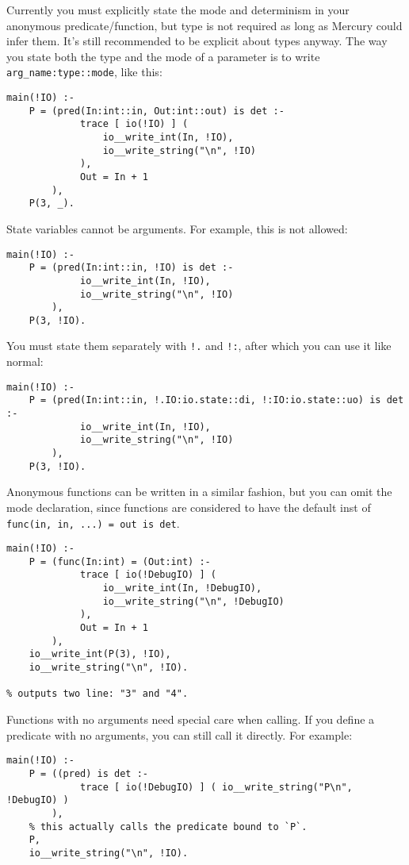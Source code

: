Currently you must explicitly state the mode and determinism in your anonymous predicate/function, but type is not required as long as Mercury could infer them. It's still recommended to be explicit about types anyway. The way you state both the type and the mode of a parameter is to write \texttt{arg_name:type::mode}, like this:

\begin{lstlisting}[language=Mercury]
main(!IO) :-
	P = (pred(In:int::in, Out:int::out) is det :-
			 trace [ io(!IO) ] (
				 io__write_int(In, !IO),
				 io__write_string("\n", !IO)
			 ),
			 Out = In + 1
		),
	P(3, _).
\end{lstlisting}

State variables cannot be arguments. For example, this is not allowed:

\begin{lstlisting}[language=Mercury]
main(!IO) :-
	P = (pred(In:int::in, !IO) is det :-
		     io__write_int(In, !IO),
		     io__write_string("\n", !IO)
		),
	P(3, !IO).
\end{lstlisting}

You must state them separately with \texttt{!.} and \texttt{!:}, after which you can use it like normal:

\begin{lstlisting}[language=Mercury]
main(!IO) :-
	P = (pred(In:int::in, !.IO:io.state::di, !:IO:io.state::uo) is det :-
		     io__write_int(In, !IO),
		     io__write_string("\n", !IO)
		),
	P(3, !IO).
\end{lstlisting}

Anonymous functions can be written in a similar fashion, but you can omit the mode declaration, since functions are considered to have the default inst of \texttt{func(in, in, ...) = out is det}.

\begin{lstlisting}[language=Mercury]
main(!IO) :-
	P = (func(In:int) = (Out:int) :-
			 trace [ io(!DebugIO) ] (
				 io__write_int(In, !DebugIO),
				 io__write_string("\n", !DebugIO)
			 ),
			 Out = In + 1
		),
	io__write_int(P(3), !IO),
	io__write_string("\n", !IO).

% outputs two line: "3" and "4".
\end{lstlisting}

Functions with no arguments need special care when calling. If you define a predicate with no arguments, you can still call it directly. For example:

\begin{lstlisting}[language=Mercury]
main(!IO) :-
	P = ((pred) is det :-
			 trace [ io(!DebugIO) ] ( io__write_string("P\n", !DebugIO) )
		),
    % this actually calls the predicate bound to `P`.
	P,  
	io__write_string("\n", !IO).
\end{lstlisting}

